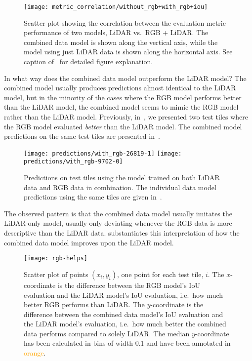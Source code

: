 \begin{figure}[H]
  \centering
  \texttt{[image: metric\_correlation/without\_rgb+with\_rgb+iou]}
  \caption{%
    Scatter plot showing the correlation between the evaluation metric performance of two models, LiDAR vs.\ RGB + LiDAR\@.
    The combined data model is shown along the vertical axis, while the model using just LiDAR data is shown along the horizontal axis.
    See caption of~ for detailed figure explanation.
  }%
  \label{fig:lidar-combined-correlation}
\end{figure}

In what way does the combined data model outperform the LiDAR model?
The combined model usually produces predictions almost identical to the LiDAR model, but in the minority of the cases where the RGB model performs better than the LiDAR model, the combined model seems to mimic the RGB model rather than the LiDAR model.
Previously, in~, we presented two test tiles where the RGB model evaluated \emph{better} than the LiDAR model.
The combined model predictions on the same test tiles are presented in~.

\begin{figure}[H]
  \centering
  \texttt{[image: predictions/with\_rgb-26819-1]}  %
  \textcolor{gray}{\vrule}
  \texttt{[image: predictions/with\_rgb-9702-0]}  %
  \caption{%
    Predictions on test tiles using the model trained on both LiDAR data and RGB data in combination.
    The individual data model predictions using the same tiles are given in~.
  }%
  \label{fig:rgb-selection}
\end{figure}

The observed pattern is that the combined data model usually imitates the LiDAR-only model, usually only deviating whenever the RGB data is more descriptive than the LiDAR data.
 substantiates this interpretation of how the combined data model improves upon the LiDAR model.

\begin{figure}[H]
  \centering
  \texttt{[image: rgb-helps]}
  \caption{%
    Scatter plot of points $(x_i, y_i)$, one point for each test tile, $i$.
    The $x$-coordinate is the difference between the RGB model's IoU evaluation and the LiDAR model's IoU evaluation, i.e.\ how much better RGB performs than LiDAR.
    The $y$-coordinate is the difference between the combined data model's IoU evaluation and the LiDAR model's evaluation, i.e.\ how much better the combined data performs compared to solely LiDAR.
    The median $y$-coordinate has been calculated in bins of width \num{0.1} and have been annotated in \textcolor{orange}{orange}.
  }%
  \label{fig:rgb-help}
\end{figure}

